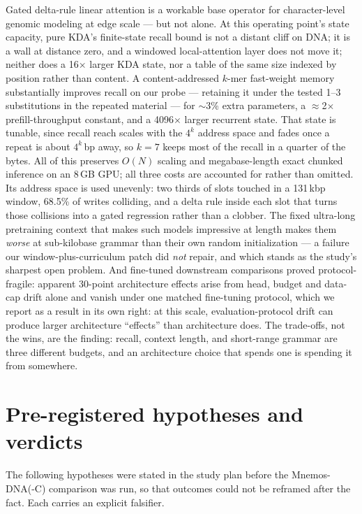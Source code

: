 \documentclass[11pt]{article}
\theoremstyle{plain}
\begin{document}
Gated delta-rule linear attention is a workable base operator for character-level genomic modeling
at edge scale --- but not alone. At this operating point's state capacity, pure KDA's
finite-state recall bound is not a distant cliff on DNA; it is a wall at distance zero, and a
windowed local-attention layer does not move it; neither does a 16$\times$ larger KDA state, nor a
table of the same size indexed by position rather than content. A
content-addressed $k$-mer fast-weight memory substantially improves recall on our probe ---
retaining it under the tested 1--3 substitutions in the repeated material --- for $\sim$3\% extra parameters, a $\approx$2$\times$
prefill-throughput constant, and a 4096$\times$ larger recurrent state. That state is tunable,
since recall reach scales with the $4^k$ address space and fades once a repeat is about $4^k$\,bp
away, so $k{=}7$ keeps most of the recall in a quarter of the bytes. All of this preserves $O(N)$
scaling and megabase-length exact chunked inference on an 8\,GB GPU; all three costs are
accounted for rather than omitted. Its address space is used
unevenly: two thirds of slots touched in a 131\,kbp window, 68.5\% of writes colliding, and a
delta rule inside each slot that turns those collisions into a gated regression rather than a
clobber. The fixed ultra-long pretraining context that makes such models impressive at length
makes them \emph{worse} at sub-kilobase grammar than their own random initialization --- a
failure our window-plus-curriculum patch did \emph{not} repair, and which stands as the study's
sharpest open problem. And fine-tuned downstream comparisons proved protocol-fragile: apparent
30-point architecture effects arise from head, budget and data-cap drift alone and vanish under
one matched fine-tuning protocol, which we report as a result in its own right: at this scale,
evaluation-protocol drift can produce larger architecture ``effects'' than architecture does.
The trade-offs, not the wins, are the finding: recall, context length, and short-range grammar
are three different budgets, and an architecture choice that spends one is spending it from
somewhere.

\appendix

\section{Pre-registered hypotheses and verdicts}\label{sec:hyp}

The following hypotheses were stated in the study plan before the Mnemos-DNA(-C) comparison was run, so
that outcomes could not be reframed after the fact. Each carries an explicit falsifier.
\end{document}
